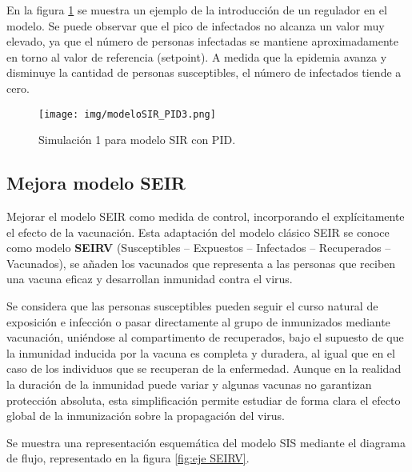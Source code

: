 En la figura \ref{fig:simu3pid} se muestra un ejemplo de la introducción de un regulador en el modelo. Se puede observar que el pico de infectados no alcanza un valor muy elevado, ya que el número de personas infectadas se mantiene aproximadamente en torno al valor de referencia (setpoint). A medida que la epidemia avanza y disminuye la cantidad de personas susceptibles, el número de infectados tiende a cero.
\begin{figure}[H]
    \centering
    \texttt{[image: img/modeloSIR\_PID3.png]}
    \caption{Simulación 1 para modelo SIR con PID.}
    \label{fig:simu3pid}
   
\end{figure}


\subsection{Mejora modelo SEIR}
Mejorar el modelo SEIR como medida de control, incorporando el explícitamente el efecto de la vacunación. Esta adaptación del modelo clásico SEIR se conoce como modelo \textbf{SEIRV} (Susceptibles – Expuestos – Infectados – Recuperados – Vacunados), se añaden los vacunados que representa a las personas que reciben una vacuna eficaz y desarrollan inmunidad contra el virus.

Se considera que las personas susceptibles pueden seguir el curso natural de exposición e infección o pasar directamente al grupo de inmunizados mediante vacunación, uniéndose al compartimento de recuperados, bajo el supuesto de que la inmunidad inducida por la vacuna es completa y duradera, al igual que en el caso de los individuos que se recuperan de la enfermedad. Aunque en la realidad la duración de la inmunidad puede variar y algunas vacunas no garantizan protección absoluta, esta simplificación permite estudiar de forma clara el efecto global de la inmunización sobre la propagación del virus.

Se muestra una representación esquemática del modelo SIS mediante el diagrama de flujo, representado en la figura \ref{fig:eje SEIRV}.

